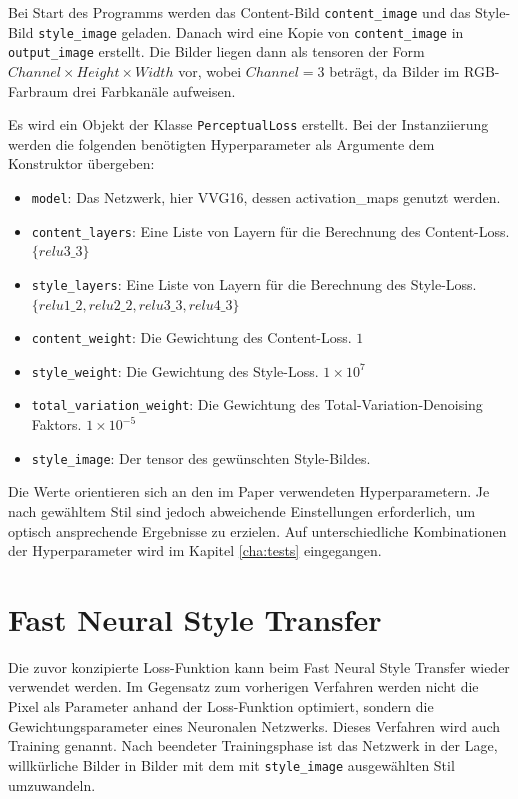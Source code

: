 Bei Start des Programms werden das Content-Bild \texttt{content_image} und das Style-Bild \texttt{style_image} geladen. Danach wird eine Kopie von \texttt{content_image} in \texttt{output_image} erstellt. Die Bilder liegen dann als \gls{tensor}en der Form $ Channel \times Height \times Width $ vor, wobei $ Channel = 3 $ beträgt, da Bilder im RGB-Farbraum drei Farbkanäle aufweisen.

Es wird ein Objekt der Klasse \texttt{PerceptualLoss} erstellt. Bei der Instanziierung werden die folgenden benötigten Hyperparameter als Argumente dem Konstruktor übergeben:

\begin{itemize}
	\item \texttt{model}: Das Netzwerk, hier VVG16, dessen \gls{activation_map}s genutzt werden.
	\item \texttt{content_layers}: Eine Liste von Layern für die Berechnung des Content-Loss.\\ $ \{ relu3\_3 \} $
	\item \texttt{style_layers}: Eine Liste von Layern für die Berechnung des Style-Loss.\\ $ \{ relu1\_2, relu2\_2, relu3\_3, relu4\_3 \} $
	\item \texttt{content_weight}: Die Gewichtung des Content-Loss. $ 1 $ 
	\item \texttt{style_weight}: Die Gewichtung des Style-Loss. $ 1 \times 10^{7} $
	\item \texttt{total_variation_weight}: Die Gewichtung des Total-Variation-Denoising Faktors. $ 1 \times 10^{-5} $
	\item \texttt{style_image}: Der \gls{tensor} des gewünschten Style-Bildes.
\end{itemize}

Die Werte orientieren sich an den im Paper \cite{DBLP:journals/corr/JohnsonAL16} verwendeten Hyperparametern. Je nach gewähltem Stil sind jedoch abweichende Einstellungen erforderlich, um optisch ansprechende Ergebnisse zu erzielen. Auf unterschiedliche Kombinationen der Hyperparameter wird im Kapitel \ref{cha:tests} eingegangen.

\section{Fast Neural Style Transfer}

Die zuvor konzipierte Loss-Funktion kann beim Fast Neural Style Transfer wieder verwendet werden. 
Im Gegensatz zum vorherigen Verfahren werden nicht die Pixel als Parameter anhand der Loss-Funktion optimiert, sondern die Gewichtungsparameter eines Neuronalen Netzwerks. Dieses Verfahren wird auch Training genannt. Nach beendeter Trainingsphase ist das Netzwerk in der Lage, willkürliche Bilder in Bilder mit dem mit \texttt{style_image} ausgewählten Stil umzuwandeln.

